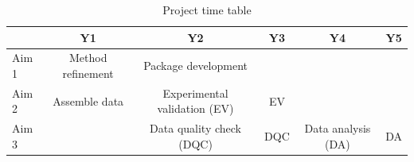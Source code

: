 \documentclass[12pt, class=article, crop=false]{standalone}
\begin{document}
\begin{table}
    \centering
    \caption{Project time table}
    \begin{tabular}{lccccc}
         & Y1 &  Y2 & Y3 & Y4 & Y5\\
         \hline
         Aim 1 & Method refinement & Package development & & & \\
         Aim 2 & Assemble data & Experimental validation (EV) & EV &  & \\
         Aim 3 & & Data quality check (DQC) & DQC & Data analysis (DA) & DA \\
    \end{tabular}
    \label{tab:tt}
\end{table}

\newpage


\end{document}
